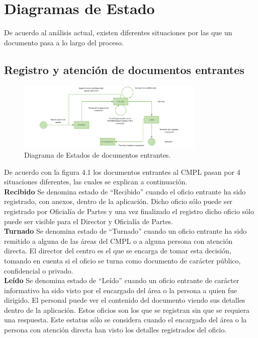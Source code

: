 \section{Diagramas de Estado}

De acuerdo al análisis actual, existen diferentes situaciones por las que un documento pasa a lo largo del proceso. \\

\subsection{Registro y atención de documentos entrantes}

	\begin{figure}[htbp!]
		\centering
			\includegraphics[width=0.8\textwidth]{images/estadosentrantes}
		\caption{Diagrama de Estados de documentos entrantes.}
	\end{figure}
	
De acuerdo con la figura 4.1 los documentos entrantes al CMPL pasan por 4 situaciones diferentes, las cuales se explican a continuación. \\ 

\textbf{Recibido}
Se denomina estado de “Recibido” cuando el oficio entrante ha sido registrado, con anexos, dentro de la aplicación. Dicho oficio sólo puede ser registrado por Oficialía de Partes y una vez finalizado el registro dicho oficio sólo puede ser visible para el Director y Oficialía de Partes.\\

\textbf{Turnado}
Se denomina estado de “Turnado” cuando un oficio entrante ha sido remitido a alguna de las áreas del CMPL o a alguna persona con atención directa. El director del centro es el que se encarga de tomar esta decisión, tomando en cuenta si el oficio se turna como documento de carácter público, confidencial o privado.\\

\textbf{Leído}
Se denomina estado de “Leído” cuando un oficio entrante de carácter informativo ha sido visto por el encargado del área o la persona a quien fue dirigido. El personal puede ver el contenido del documento viendo sus detalles dentro de la aplicación. Estos oficios son los que se registran sin que se requiera una respuesta. Este estatus sólo se considera cuando el encargado del área o la persona con atención directa han visto los detalles registrados del oficio.\\

